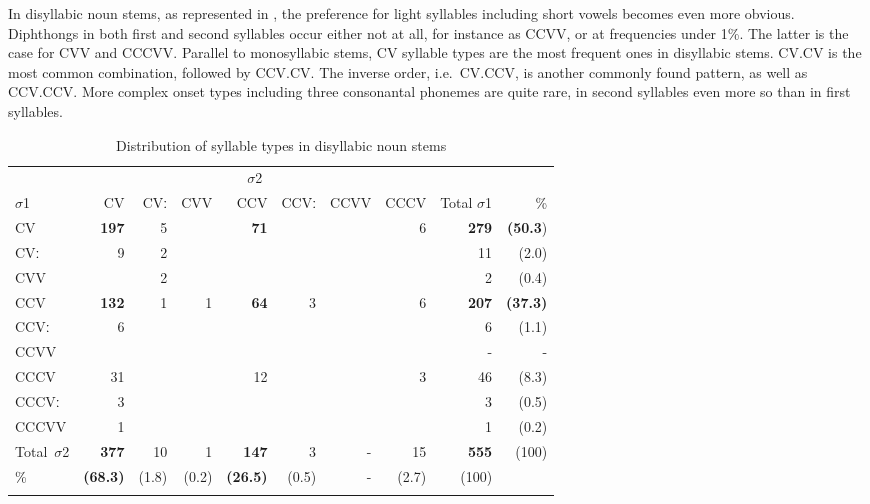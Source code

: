 In disyllabic noun stems, as represented in , the preference for light syllables including short vowels becomes even more obvious. Diphthongs in both first and second syllables occur either not at all, for instance as CCVV, or at frequencies under 1\%. The latter is the case for CVV and CCCVV. Parallel to monosyllabic stems, CV syllable types are the most frequent ones in disyllabic stems. CV.CV is the most common combination, followed by CCV.CV. The inverse order, i.e.\ CV.CCV, is  another commonly found pattern, as well as CCV.CCV. More complex onset types including three consonantal phonemes are quite rare, in second syllables even more so than in first syllables.

\begin{table}[t]
\small
\begin{tabularx}{\textwidth}{X rrrrrrr rr}
\lsptoprule
& \multicolumn{7}{c}{$\sigma$2}\\
\cmidrule{2-8}
$\sigma$1& CV &  CVː & 	CVV & CCV & CCVː & 	CCVV & 	CCCV & 	Total $\sigma$1 & \% \\
\midrule
CV	&	{\bfseries 197} &	5 &		&	{\bfseries 71} &	   &   		 &	6 &		{\bfseries 279} & {\bfseries (50.3}) \\
CVː 	& 	9 & 		2 & 		& 	    & 		&  		& 	& 		11 & (2.0) \\
CVV 	&       & 		2 & 		& 	& 		& 		& 	& 		2 & (0.4) \\
\midrule
CCV 	& 	{\bfseries 132}	& 1	& 1	&	{\bfseries 64}	&    3 & 			& 6		& 	{\bfseries 207} & {\bfseries (37.3)} \\			
CCVː & 	6	& & & & & & & 									6  &  (1.1) \\	
CCVV & 	 & & & & & &   & - & - 										\\
\midrule
CCCV & 	31 & &  & 	 	12 &  &  & 		3 & 				46 &(8.3)  \\	
CCCVː & 	3	& & & & & & & 									3  & (0.5) \\
CCCVV & 	1	& & & & & & & 									1 & (0.2) \\  \midrule													
\mbox{Total $\sigma$2}&{\bfseries 377}  & 10 & 1 & {\bfseries 147} & 3 & - & 15 & {\bfseries 555} & (100)   \\
\%                    & {\bfseries (68.3)} & (1.8) & (0.2) & {\bfseries (26.5)} & (0.5) & - &  (2.7) & (100) \\ 
\lspbottomrule
\end{tabularx}
\caption{Distribution of syllable types in disyllabic noun stems}
\label{Tab:o2Syll}
\end{table}






